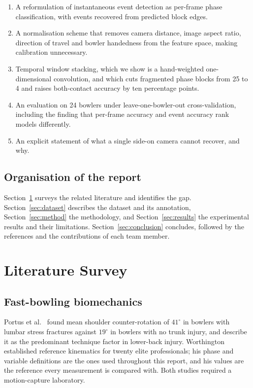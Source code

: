 \documentclass[11pt,a4paper]{article}
\begin{document}
\begin{enumerate}
  \item A reformulation of instantaneous event detection as per-frame phase
        classification, with events recovered from predicted block edges.
  \item A normalisation scheme that removes camera distance, image aspect
        ratio, direction of travel and bowler handedness from the feature
        space, making calibration unnecessary.
  \item Temporal window stacking, which we show is a hand-weighted
        one-dimensional convolution, and which cuts fragmented phase blocks
        from 25 to 4 and raises both-contact accuracy by ten percentage
        points.
  \item An evaluation on 24 bowlers under leave-one-bowler-out
        cross-validation, including the finding that per-frame accuracy and
        event accuracy rank models differently.
  \item An explicit statement of what a single side-on camera cannot recover,
        and why.
\end{enumerate}

\subsection{Organisation of the report}

Section~\ref{sec:survey} surveys the related literature and identifies the
gap. Section~\ref{sec:dataset} describes the dataset and its annotation,
Section~\ref{sec:method} the methodology, and Section~\ref{sec:results} the
experimental results and their limitations. Section~\ref{sec:conclusion}
concludes, followed by the references and the contributions of each team
member.

\section{Literature Survey}
\label{sec:survey}

\subsection{Fast-bowling biomechanics}

Portus et al.~\cite{portus2004} found mean shoulder counter-rotation of
$41^\circ$ in bowlers with lumbar stress fractures against $19^\circ$ in
bowlers with no trunk injury, and describe it as the predominant technique
factor in lower-back injury. Worthington~\cite{worthington2010}
established reference kinematics for twenty elite professionals; his phase and
variable definitions are the ones used throughout this report, and his values
are the reference every measurement is compared with. Both studies required a
motion-capture laboratory.
\end{document}
